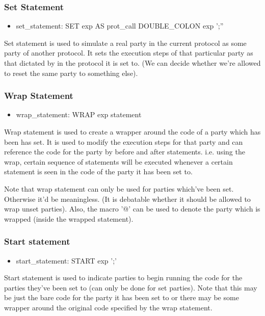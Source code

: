 \subsubsection{Set Statement}
\begin{itemize}
\item set\_statement: SET exp AS prot\_call DOUBLE\_COLON exp ';''
\end{itemize}

Set statement is used to simulate a real party in the current protocol as some party of another protocol. It sets the execution steps of that particular party as that dictated by in the protocol it is set to. (We can decide whether we're allowed to reset the same party to something else).

\subsubsection{Wrap Statement}

\begin{itemize}
\item wrap\_statement: WRAP exp statement
\end{itemize}

Wrap statement is used to create a wrapper around the code of a party which has been has set. It is used to modify the execution steps for that party and can reference the code for the party by before and after statements. i.e. using the wrap, certain sequence of statements will be executed whenever a certain statement is seen in the code of the party it has been set to.

Note that wrap statement can only be used for parties which've been set. Otherwise it'd be meaningless. (It is debatable whether it should be allowed to wrap unset parties). Also, the macro '@' can be used to denote the party which is wrapped (inside the wrapped statement).

\subsubsection{Start statement}
\begin{itemize}
\item start\_statement: START exp ';'
\end{itemize}

Start statement is used to indicate parties to begin running the code for the parties they've been set to (can only be done for set parties). Note that this may be just the bare code for the party it has been set to or there may be some wrapper around the original code specified by the wrap statement.

